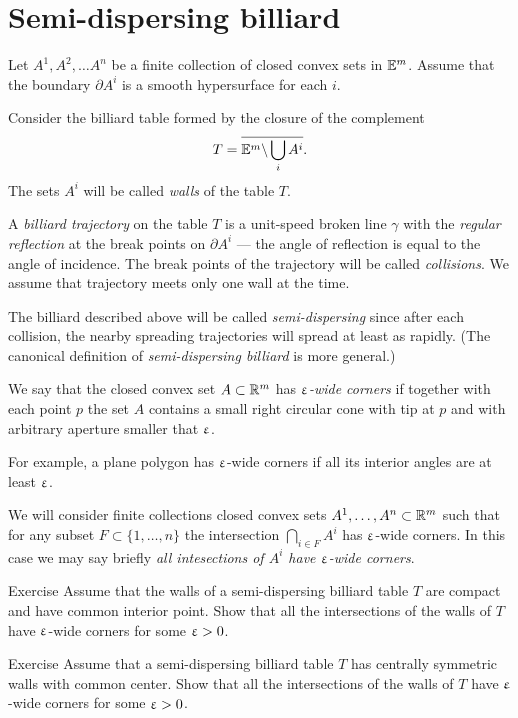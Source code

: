 \section{Semi-dispersing billiard}

Let $A^1,A^2,\dots A^n$ be a finite collection of closed convex sets in $\mathbb{E}^m$.
Assume that the boundary $\partial A^i$ is a smooth hypersurface for each $i$.

Consider the billiard table formed by the closure of the complement 
$$T=\overline{\mathbb{E}^m\backslash \bigcup_{i} A^i}.$$
The sets $A^i$ will be called \emph{walls} of the table $T$.

A \emph{billiard trajectory} 
on the table $T$ is a unit-speed broken line $\gamma$
with the \emph{regular reflection} at the break points on $\partial A^i$ 
--- the angle of reflection is equal to the angle of incidence.
The break points of the trajectory will be called \emph{collisions}.
We assume that trajectory meets only one wall at the time.

The billiard described above will be called \emph{semi-dispersing} since after each collision, the nearby spreading trajectories will spread at least as rapidly.
(The canonical definition of  \emph{semi-dispersing billiard} is more general.)

We say that the closed convex set $A\subset \RR^m$ has  \emph{$\upvarepsilon$-wide corners} 
if together with each point $p$
the set $A$ contains a small right circular cone
with tip at $p$ and
with arbitrary aperture smaller that $\upvarepsilon$.

For example, 
a plane polygon 
has $\upvarepsilon$-wide corners
if all its interior angles are at least $\upvarepsilon$.

We will consider finite collections closed convex sets 
$A^1,\dots,A^n\subset\RR^m$ 
such that for any subset $F\subset\{1,\dots,n\}$
the intersection
$\bigcap_{i\in F}A^i$ 
has $\upvarepsilon$-wide corners.
In this case we may say briefly \emph{all intesections of $A^i$ have $\upvarepsilon$-wide corners}.

\begin{thm}{Exercise}
Assume that the walls
of a semi-dispersing billiard table $T$ 
are compact and have common interior point.
Show that all the intersections of the walls of $T$ have $\upvarepsilon$-wide corners for some $\upvarepsilon>0$.
\end{thm}

\begin{thm}{Exercise}\label{ex:centrally-simmetric-walls}
Assume that a semi-dispersing billiard table $T$ has
centrally symmetric walls with common center.
Show that all the intersections of the walls of $T$  have $\upvarepsilon$-wide corners for some $\upvarepsilon>0$.
\end{thm}

